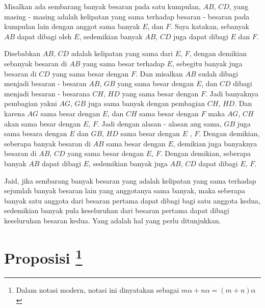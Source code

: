 \documentclass[a4paper]{book}
\begin{document}
Misalkan ada sembarang banyak besaran pada satu kumpulan, $AB$, $CD$, 
yang masing - masing adalah kelipatan yang sama terhadap besaran - besaran 
pada kumpulan lain dengan anggot sama banyak $E$, dan $F$. Saya katakan, 
sebanyak $AB$ dapat dibagi oleh $E$, sedemikian banyak
$AB$, $CD$ juga dapat dibagi $E$ dan $F$.

Disebabkan $AB$, $CD$ adalah kelipatan yang sama dari $E$, $F$, dengan
demikian sebanyak besaran di $AB$ yang sama besar terhadap $E$, sebegitu
banyak juga besaran di $CD$ yang sama besar dengan $F$. Dan misalkan
$AB$ sudah dibagi menjadi besaran - besaran $AB$, $GB$ yang sama besar dengan
$E$, dan $CD$ dibagi menjadi besaran - besarana $CH$, $HD$ yang sama besar
dengan $F$. Jadi banyaknya pembagian yakni $AG$, $GB$ juga sama banyak dengan
pembagian $CH$, $HD$. Dan karena $AG$ sama besar dengan $E$, dan $CH$ sama 
besar dengan $F$ maka $AG$, $CH$ akan sama besar dengan $E$, $F$. Jadi dengan
alasan - alasan ang sama,  $GB$ juga sama besara dengan $E$ dan $GB$, $HD$ sama
besar dengan $E$ , $F$. Dengan demikian, seberapa banyak besaran di $AB$ sama
besar dengan $E$, demikian juga banyaknya besaran di $AB$, $CD$ yang sama besar
dengan $E$, $F$. Dengan demikian, seberapa banyak $AB$ dapat dibagi $E$, 
sedemikian banyak juga $AB$, $CD$ dapat dibagi $E$, $F$.

Jaid, jika sembarang banyak besaran yang adalah kelipatan yang sama terhadap
sejumlah banyak besaran lain yang anggotanya sama banyak, maka seberapa banyak
satu anggota dari besaran pertama dapat dibagi bagi satu anggota kedua, 
sedemikian banyak pula keseluruhan dari besaran pertama dapat dibagi 
keseluruhan besaran kedua. Yang adalah hal yang perlu ditunjukkan.


\section*{\centering Proposisi \thesection\footnote{Dalam notasi modern, 
notasi ini dinyatakan sebagai $m\alpha + n\alpha = (m+n)\alpha$}}
\end{document}
